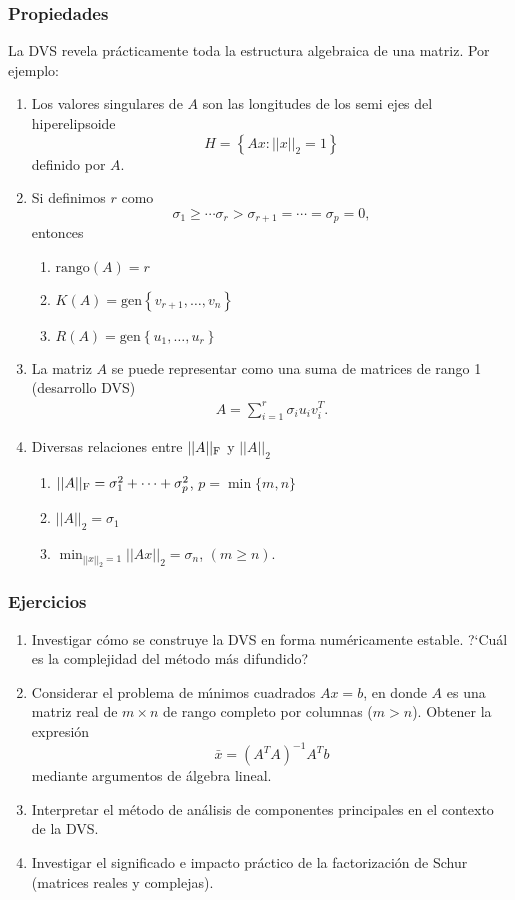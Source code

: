 \documentclass[12pt]{article}
\begin{document}
\subsubsection*{Propiedades}

La DVS revela pr\'acticamente toda la estructura algebraica de una matriz. Por ejemplo:
\begin{enumerate}
  \item Los valores singulares de $A$ son las longitudes de los semi ejes del hiperelipsoide 
        \[
           H = \left \{ Ax : ||x||_2 =1 \right \}
        \]
         definido por $A$.
  \item Si definimos $r$ como 
  \[
     \sigma_1 \ge \cdots \sigma_r > \sigma_{r+1} = \cdots = \sigma_p = 0,
  \]
  entonces 
    \begin{enumerate}
     \item $\mbox{rango}(A) = r$
     \item $K(A) = \mbox{gen} \left \{ v_{r+1}, \ldots, v_n \right \}$
     \item $R(A) = \mbox{gen} \left \{ u_1, \ldots, u_r \right \}$
    \end{enumerate}
  \item La matriz $A$ se puede representar como una suma de matrices de rango 1 (desarrollo DVS)
         \begin{eqnarray} \label{suma}
            A = \sum_{i=1}^r \sigma_i u_i v_i^T.
         \end{eqnarray}
  \item Diversas relaciones entre  $||A||_{\rm F}$ y $||A||_2$
        \begin{enumerate}
         \item $||A||_{\rm F} = \sigma_1^2 + \cdots + \sigma_p^2$, \quad $p = \min\{m,n\}$
         \item $||A||_2 = \sigma_1$
         \item $\displaystyle{ \min_{||x||_2 = 1} ||Ax||_2 = \sigma_n}$, \quad $(m \ge n)$.
        \end{enumerate}
\end{enumerate}


\subsubsection*{Ejercicios}

\begin{enumerate}
 \item Investigar c\'omo se construye la DVS en forma num\'ericamente estable. ?`Cu\'al es la complejidad del m\'etodo m\'as difundido?
 \item Considerar el problema de m\'{\i}nimos cuadrados $Ax = b$, en donde $A$ es una matriz real de $m \times n$ de rango completo por columnas ($m>n$).  Obtener la expresi\'on 
 \[
         \bar{x} = (A^TA)^{-1} A^T b
 \]
 mediante argumentos de \'algebra lineal.
 \item Interpretar el m\'etodo de an\'alisis de componentes principales en el contexto de la DVS.
 \item Investigar el significado e impacto pr\'actico de la factorizaci\'on de Schur (matrices reales y complejas).
\end{enumerate}
 
\end{document}
